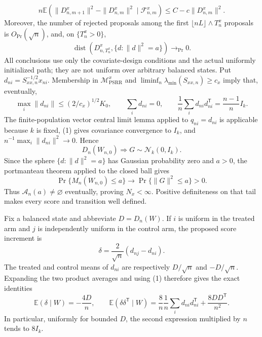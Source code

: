 \[
 n\mathbb E\!\left(\|D^x_{n,m+1}\|^2-\|D^x_{n,m}\|^2\mid\mathcal F^x_{n,m}\right)
 \le C-c\|D^x_{n,m}\|^2.
\]
Moreover, the number of rejected proposals among the first \(\lfloor nL\rfloor\wedge T_n^x\) proposals is \(O_{\Pr}(\sqrt n)\), and, on \(\{T_n^x>0\}\),
\[
 \operatorname{dist}\!\left(D^x_{n,T_n^x},\{d:\|d\|^2=a\}\right)\longrightarrow_{\Pr}0.
\]
All conclusions use only the covariate-design conditions and the actual uniformly initialized path; they are not uniform over arbitrary balanced states.
Put \(d_{ni}=S_{xx,n}^{-1/2}x_{ni}\).  Membership in \(\mathcal M_{\mathrm{PSRR}}^{x}\) and \(\liminf_n\lambda_{\min}(S_{xx,n})\ge c_x\) imply that, eventually,
\[
 \max_i\|d_{ni}\|\le (2/c_x)^{1/2}K_0,
 \qquad \sum_i d_{ni}=0,
 \qquad \frac1n\sum_i d_{ni}d_{ni}^{\mathsf T}=\frac{n-1}{n}I_k. \tag{1}
\]
The finite-population vector central limit lemma applied to \(q_{ni}=d_{ni}\) is applicable because \(k\) is fixed, (1) gives covariance convergence to \(I_k\), and \(n^{-1}\max_i\|d_{ni}\|^2\to0\).  Hence
\[
 D_n(W_{n,0})\Rightarrow G\sim\mathcal N_k(0,I_k). \tag{2}
\]
Since the sphere \(\{d:\|d\|^2=a\}\) has Gaussian probability zero and \(a>0\), the portmanteau theorem applied to the closed ball gives
\[
 \Pr\{M_n(W_{n,0})\le a\}\longrightarrow\Pr\{\|G\|^2\le a\}>0. \tag{3}
\]
Thus \(\mathcal A_n(a)\ne\varnothing\) eventually, proving \(N_x<\infty\).  Positive definiteness on that tail makes every score and transition well defined.

Fix a balanced state and abbreviate \(D=D_n(W)\).  If \(i\) is uniform in the treated arm and \(j\) is independently uniform in the control arm, the proposed score increment is
\[
 \delta=\frac{2}{\sqrt n}(d_{nj}-d_{ni}).
\]
The treated and control means of \(d_{ni}\) are respectively \(D/\sqrt n\) and \(-D/\sqrt n\).  Expanding the two product averages and using (1) therefore gives the exact identities
\[
 \mathbb E(\delta\mid W)=-\frac{4D}{n},
 \qquad
 \mathbb E(\delta\delta^{\mathsf T}\mid W)
 =\frac{8}{n}\frac1n\sum_i d_{ni}d_{ni}^{\mathsf T}+\frac{8DD^{\mathsf T}}{n^2}. \tag{4}
\]
In particular, uniformly for bounded \(D\), the second expression multiplied by \(n\) tends to \(8I_k\).

